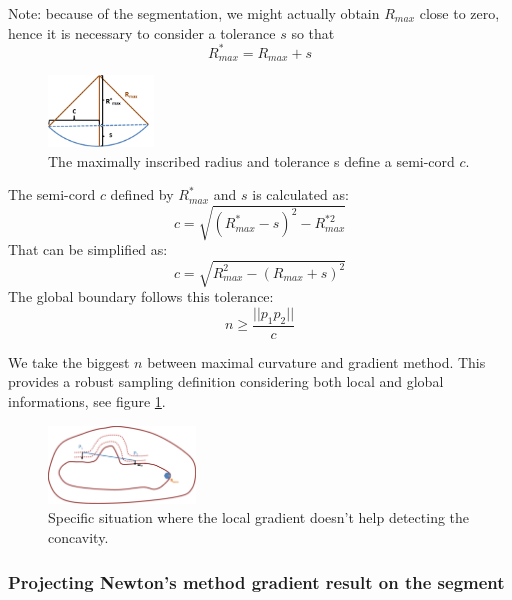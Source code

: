 \documentclass[11pt,a4paper]{article}
\begin{document}
Note: because of the segmentation, we might actually obtain $R_{max}$ close to zero, hence it is necessary to consider a tolerance $s$ so that 
\begin{equation}
R_{max}^* = R_{max} + s
\end{equation}

\begin{figure}[h!]
			\centering
			\includegraphics[width=0.25\textwidth]{Drawings/CurvatureTolerance.png}
			\caption{The maximally inscribed radius and tolerance s define a semi-cord $c$.}
\end{figure}

The semi-cord $c$ defined by $R_{max}^*$ and $s$ is calculated as:
\begin{equation}
c = \sqrt{(R_{max}^*-s)^2 - R_{max}^{*2}}
\end{equation} 
That can be simplified as:
\begin{equation}
c = \sqrt{R_{max}^2 - (R_{max} + s)^2}
\end{equation}
The global boundary follows this tolerance:
\begin{equation}
n \geq \frac{||p_1p_2||}{c}
\end{equation}

We take the biggest $n$ between maximal curvature and gradient method. This provides a robust sampling definition considering both local and global informations, see figure \ref{test sampling}.
\begin{figure}[h!]
			\label{test sampling}
			\centering
			\includegraphics[width=0.35\textwidth]{Drawings/CurvatureTestExample2.png}
			\caption{Specific situation where the local gradient doesn't help detecting the concavity.}
\end{figure}

\subsubsection{Projecting Newton's method gradient result on the segment}
\end{document}
